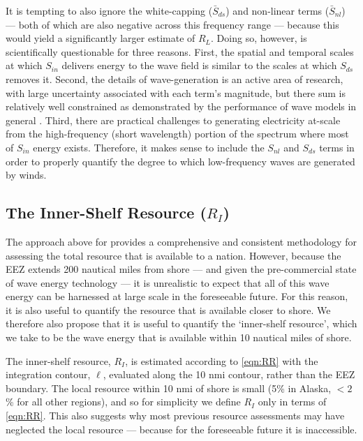 It is tempting to also ignore the white-capping ($\bar{S}_{ds}$) and non-linear terms ($\bar{S}_{nl}$) — both of which are also negative across this frequency range — because this would yield a significantly larger estimate of $R_L$. Doing so, however, is scientifically questionable for three reasons. First, the spatial and temporal scales at which $S_{in}$ delivers energy to the wave field is similar to the scales at which $S_{ds}$ removes it. Second, the details of wave-generation is an active area of research, with large uncertainty associated with each term's magnitude, but there sum is relatively well constrained as demonstrated by the performance of wave models in general \citep[e.g.][]{ardhuin_semiempirical_2010,van_vledder_source_2016}. Third, there are practical challenges to generating electricity at-scale from the high-frequency (short wavelength) portion of the spectrum where most of $S_{in}$ energy exists. Therefore, it makes sense to include the $S_{nl}$ and $S_{ds}$ terms in order to properly quantify the degree to which low-frequency waves are generated by winds.

\subsection{The Inner-Shelf Resource ($R_I$)}

The approach above for provides a comprehensive and consistent methodology for assessing the total resource that is available to a nation. However, because the EEZ extends 200 nautical miles from shore — and given the pre-commercial state of wave energy technology — it is unrealistic to expect that all of this wave energy can be harnessed at large scale in the foreseeable future. For this reason, it is also useful to quantify the resource that is available closer to shore. We therefore also propose that it is useful to quantify the `inner-shelf resource', which we take to be the wave energy that is available within 10 nautical miles of shore.

The inner-shelf resource, $R_I$, is estimated according to \eqref{eqn:RR} with the integration contour, $\ell$, evaluated along the 10 nmi contour, rather than the EEZ boundary.  The local resource within 10 nmi of shore is small (5\% in Alaska, $<2$\% for all other regions), and so for simplicity we define $R_I$ only in terms of \eqref{eqn:RR}. This also suggests why most previous resource assessments may have neglected the local resource — because for the foreseeable future it is inaccessible.

